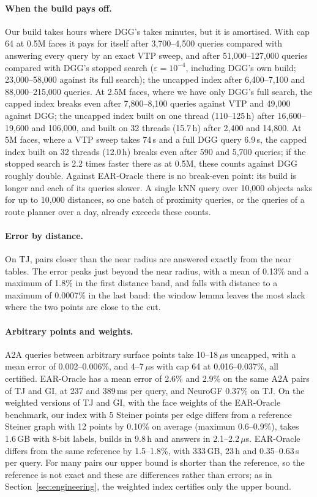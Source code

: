 \documentclass[sigconf,nonacm,screen]{acmart}
\newcommand{\eps}{\varepsilon}
\begin{document}
\paragraph{When the build pays off.}
Our build takes hours where DGG's takes minutes, but it is amortised. With cap 64 at 0.5M faces
it pays for itself after 3,700--4,500 queries compared with answering every query by an exact VTP sweep, and after
51,000--127,000 queries compared with DGG's stopped search ($\eps=10^{-4}$, including DGG's own build; 23,000--58,000
against its full search); the uncapped index after 6,400--7,100 and 88,000--215,000 queries. At 2.5M faces, where we
have only DGG's full search, the capped index breaks even after 7,800--8,100 queries
against VTP and 49,000 against DGG; the uncapped index built on one thread (110--125\,h) after 16,600--19,600 and
106,000, and built on 32 threads (15.7\,h) after 2,400 and 14,800. At 5M faces, where a VTP sweep takes 74\,s and a
full DGG query 6.9\,s, the capped index built on 32 threads (12.0\,h) breaks even after 590 and 5,700 queries; if the
stopped search is 2.2 times faster there as at 0.5M, these counts against DGG roughly double.
Against EAR-Oracle there is no break-even point: its build is longer and each of its queries slower. A single kNN
query over 10,000 objects asks for up to 10,000 distances, so one batch of proximity queries, or the queries of a
route planner over a day, already exceeds these counts.

\paragraph{Error by distance.}
On TJ, pairs closer than the near radius are answered exactly from the near tables. The error peaks just beyond
the near radius, with a mean of 0.13\% and a maximum of 1.8\% in the first distance band, and falls with distance
to a maximum of 0.0007\% in the last band: the window lemma leaves the most slack where the two points are close to the cut.

\paragraph{Arbitrary points and weights.}
A2A queries between arbitrary surface points take 10--18\,$\mu$s uncapped, with a mean error of 0.002--0.006\%, and
4--7\,$\mu$s with cap 64 at 0.016--0.037\%, all certified. EAR-Oracle has a mean error of 2.6\% and 2.9\% on the
same A2A pairs of TJ and GI, at 237 and 389\,ms per query, and NeuroGF 0.37\% on TJ. On the weighted versions of TJ
and GI, with the face weights of the EAR-Oracle benchmark, our index with 5 Steiner points per edge differs from a
reference Steiner graph with 12 points by 0.10\% on average (maximum 0.6--0.9\%), takes 1.6\,GB with 8-bit labels,
builds in 9.8\,h and answers in 2.1--2.2\,$\mu$s. EAR-Oracle differs from the same reference by 1.5--1.8\%, with
333\,GB, 23\,h and 0.35--0.63\,s per query. For many pairs our upper bound is shorter than the reference, so the
reference is not exact and these are differences rather than errors; as in Section~\ref{sec:engineering}, the
weighted index certifies only the upper bound.
\end{document}
